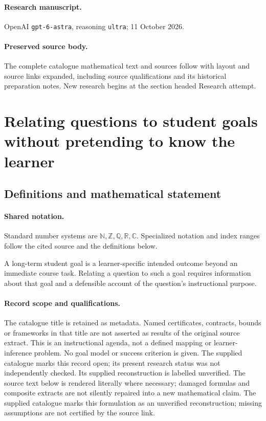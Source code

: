 \documentclass[11pt]{article}
\begin{document}
\paragraph{Research manuscript.} OpenAI \texttt{gpt-6-astra}, reasoning \texttt{ultra}; 11 October 2026.
\paragraph{Preserved source body.} The complete catalogue mathematical text and sources follow with layout and source links expanded, including source qualifications and its historical preparation notes. New research begins at the section headed Research attempt.

\section{Relating questions to student goals without pretending to know the learner}\label{statement}

\subsection{Definitions and mathematical statement}

\paragraph{Shared notation.}Standard number systems are $\mathbb N,\mathbb Z,\mathbb Q,\mathbb R,\mathbb C$. Specialized notation and index ranges follow the cited source and the definitions below.


A long-term student goal is a learner-specific intended outcome beyond an immediate course task. Relating a question to such a goal requires information about that goal and a defensible account of the question's instructional purpose.
\paragraph{Record scope and qualifications.}
The catalogue title is retained as metadata. Named certificates, contracts, bounds or frameworks in that title are not asserted as results of the original source extract.
This is an instructional agenda, not a defined mapping or learner-inference problem. No goal model or success criterion is given. The supplied catalogue marks this record open; its present research status was not independently checked. Its supplied reconstruction is labelled unverified.
The source text below is rendered literally where necessary; damaged formulas and composite extracts are not silently repaired into a new mathematical claim.
The supplied catalogue marks this formulation as an unverified reconstruction; missing assumptions are not certified by the source link.
\end{document}
